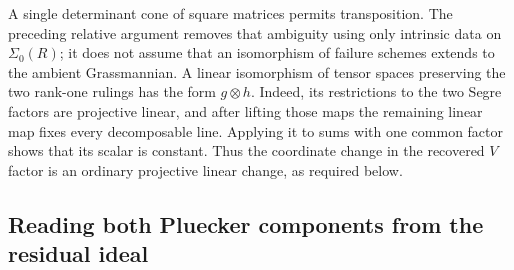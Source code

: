 \begin{remark}
A single determinant cone of square matrices permits transposition.
The preceding relative argument removes that ambiguity using only
intrinsic data on \(\Sigma_0(R)\); it does not assume that an
isomorphism of failure schemes extends to the ambient Grassmannian.
A linear isomorphism of tensor spaces preserving the two rank-one
rulings has the form \(g\otimes h\).  Indeed, its restrictions
to the two Segre factors are projective linear, and after lifting
those maps the remaining linear map fixes every decomposable line.
Applying it to sums with one common factor shows that its scalar is
constant.  Thus the coordinate change in the recovered \(V\)
factor is an ordinary projective linear change, as required below.
\end{remark}



\subsection{Reading both Pluecker components from the residual ideal}

